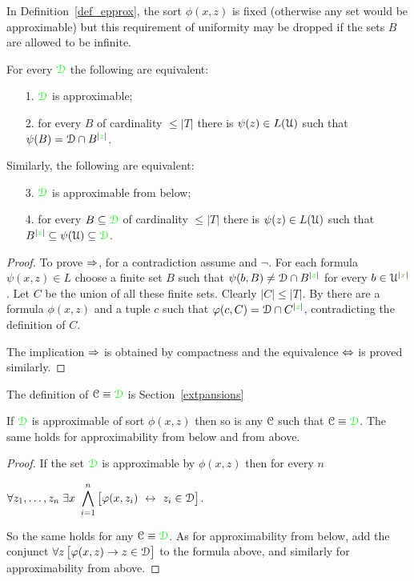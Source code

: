 \documentclass[creche.tex]{subfiles}
\begin{document}
In Definition~\ref{def_epprox}, the sort $\phi(x,z)$ is fixed (otherwise any set would be approximable) but this requirement of uniformity may be dropped if the sets $B$ are allowed to be infinite.

\begin{proposition}\label{lem_approx_nonunif}
For every ${\color{green}\EuScript D}$ the following are equivalent:
\begin{itemize}
\item[1.] ${\color{green}\EuScript D}$ is approximable;
\item[2.] for every $B$ of cardinality $\le|T|$ there is $\psi(z)\in L(\EuScript U)$ such that $\psi(B)=\EuScript D\cap B^{|{\color{green} z}|}$.
\end{itemize}
Similarly, the following are equivalent:
\begin{itemize}
\item[3.] ${\color{green}\EuScript D}$ is approximable from below;
\item[4.]  for every $B\subseteq{\color{green}\EuScript D}$ of cardinality $\le|T|$ there is $\psi(z)\in L(\EuScript U)$ such that $B^{|{\color{green} z}|}\subseteq \psi(\EuScript U)\subseteq{\color{green}\EuScript D}$.
\end{itemize}
\end{proposition}

\begin{proof}
To prove $\Rightarrow$, for a contradiction assume  and $\neg$. For each formula $\psi(x,z)\in L$ choose a finite set $B$ such that $\psi(b,B)\neq\EuScript D\cap B^{|{\color{green} z}|}$ for every $b\in\EuScript U^{|{\color{brown} x}|}$. Let $C$ be the union of all these finite sets. Clearly $|C|\le|T|$.  By  there are a formula $\phi(x,z)$ and a tuple $c$ such that $\varphi(c,C)=\EuScript D\cap C^{|{\color{green} z}|}$, contradicting the definition of $C$.

The implication $\Rightarrow$ is obtained by compactness and the equivalence $\Leftrightarrow$ is proved similarly. 
\end{proof}

The definition of  $\EuScript C\equiv{\color{green}\EuScript D}$ is Section~\ref{extpansions}

\begin{proposition}\label{prop_approx_el_eq}
If ${\color{green}\EuScript D}$ is approximable of sort $\phi(x,z)$ then so is any $\EuScript C$ such that $\EuScript C\equiv{\color{green}\EuScript D}$. The same holds for approximability from below and from above.
\end{proposition}

\begin{proof}
If the set ${\color{green}\EuScript D}$ is approximable by $\phi(x,z)$ then for every $n$

\hfil$\displaystyle\A z_1,\dots,z_n\;\E x\ \bigwedge^n_{i=1}\big[\phi(x,z_i)\ \iff\ z_i\in\D\big]$. 

So the same holds for any $\EuScript C\equiv{\color{green}\EuScript D}$. As for approximability from below, add the conjunct $\forall z\,\big[\varphi(x,z)\rightarrow z\in\EuScript D\big]$ to the formula above, and similarly for approximability from above.
\end{proof}
\end{document}
